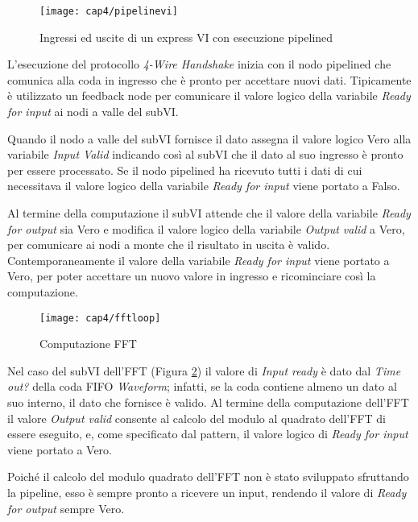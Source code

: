 \begin{figure}[H]
  \begin{center}
    \texttt{[image: cap4/pipelinevi]}
    \caption{Ingressi ed uscite di un express VI con esecuzione pipelined}
    \label{pipelinevi}
  \end{center}
\end{figure}

L'esecuzione del protocollo \textit{4-Wire Handshake} inizia con il nodo pipelined che comunica alla coda in ingresso che è pronto per accettare nuovi dati. Tipicamente è utilizzato un feedback node per comunicare il valore logico della variabile \textit{Ready for input} ai nodi a valle del subVI. 

Quando il nodo a valle del subVI fornisce il dato assegna il valore logico Vero alla variabile \textit{Input Valid} indicando così al subVI che il dato al suo ingresso è pronto per essere processato. Se il nodo pipelined ha ricevuto tutti i dati di cui necessitava il valore logico della variabile \textit{Ready for input} viene portato a Falso.

Al termine della computazione il subVI attende che il valore della variabile \textit{Ready for output} sia Vero e modifica il valore logico della variabile \textit{Output valid} a Vero, per comunicare ai nodi a monte che il risultato in uscita è valido. Contemporaneamente il valore della variabile \textit{Ready for input} viene portato a Vero, per poter accettare un nuovo valore in ingresso e ricominciare così la computazione.

\begin{figure}[H]  
  \begin{center}
    \texttt{[image: cap4/fftloop]}
    \caption{Computazione FFT}
    \label{compfftciclo}
  \end{center}
\end{figure}

Nel caso del subVI dell'FFT (Figura \ref{compfftciclo}) il valore di \textit{Input ready} è dato dal \textit{Time out?} della coda FIFO \textit{Waveform}; infatti, se la coda contiene almeno un dato al suo interno, il dato che fornisce è valido. Al termine della computazione dell'FFT il valore \textit{Output valid} consente al calcolo del modulo al quadrato dell'FFT di essere eseguito, e, come specificato dal pattern, il valore logico di \textit{Ready for input} viene portato a Vero.

Poiché il calcolo del modulo quadrato dell'FFT non è stato sviluppato sfruttando la pipeline, esso è sempre pronto a ricevere un input, rendendo il valore di \textit{Ready for output} sempre Vero.

